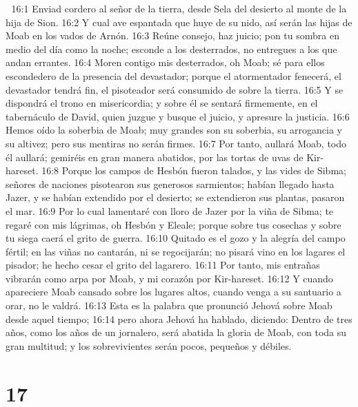 
16:1 Enviad cordero al señor de la tierra, desde Sela del desierto al monte de la hija de Sion.  
16:2 Y cual ave espantada que huye de su nido, así serán las hijas de Moab en los vados de Arnón.  
16:3 Reúne consejo, haz juicio; pon tu sombra en medio del día como la noche; esconde a los desterrados, no entregues a los que andan errantes.  
16:4 Moren contigo mis desterrados, oh Moab; sé para ellos escondedero de la presencia del devastador; porque el atormentador fenecerá, el devastador tendrá fin, el pisoteador será consumido de sobre la tierra.  
16:5 Y se dispondrá el trono en misericordia; y sobre él se sentará firmemente, en el tabernáculo de David, quien juzgue y busque el juicio, y apresure la justicia.  
16:6 Hemos oído la soberbia de Moab; muy grandes son su soberbia, su arrogancia y su altivez; pero sus mentiras no serán firmes.  
16:7 Por tanto, aullará Moab, todo él aullará; gemiréis en gran manera abatidos, por las tortas de uvas de Kir-hareset.  
16:8 Porque los campos de Hesbón fueron talados, y las vides de Sibma; señores de naciones pisotearon sus generosos sarmientos; habían llegado hasta Jazer, y se habían extendido por el desierto; se extendieron sus plantas, pasaron el mar.  
16:9 Por lo cual lamentaré con lloro de Jazer por la viña de Sibma; te regaré con mis lágrimas, oh Hesbón y Eleale; porque sobre tus cosechas y sobre tu siega caerá el grito de guerra.  
16:10 Quitado es el gozo y la alegría del campo fértil; en las viñas no cantarán, ni se regocijarán; no pisará vino en los lagares el pisador; he hecho cesar el grito del lagarero.  
16:11 Por tanto, mis entrañas vibrarán como arpa por Moab, y mi corazón por Kir-hareset.  
16:12 Y cuando apareciere Moab cansado sobre los lugares altos, cuando venga a su santuario a orar, no le valdrá.  
16:13 Esta es la palabra que pronunció Jehová sobre Moab desde aquel tiempo;  
16:14 pero ahora Jehová ha hablado, diciendo: Dentro de tres años, como los años de un jornalero, será abatida la gloria de Moab, con toda su gran multitud; y los sobrevivientes serán pocos, pequeños y débiles. 

\chapter{17}

